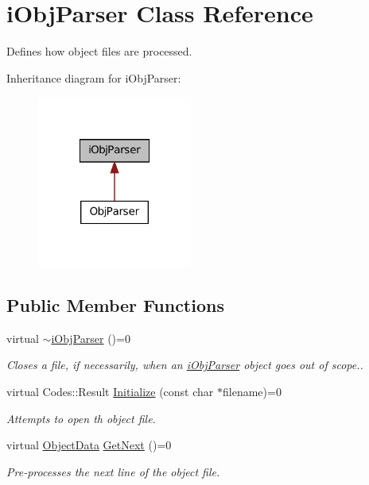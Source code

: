 \hypertarget{classiObjParser}{
\section{iObjParser Class Reference}
\label{classiObjParser}
}


Defines how object files are processed.  




Inheritance diagram for iObjParser:
\nopagebreak
\begin{figure}[H]
\begin{center}
\leavevmode
\includegraphics[width=144pt]{classiObjParser__inherit__graph}
\end{center}
\end{figure}
\subsection*{Public Member Functions}
\begin{DoxyCompactItemize}
\item 
\hypertarget{classiObjParser_ae88aacaa19a6aa6d4a7c82c02eabc3dc}{
virtual \hyperlink{classiObjParser_ae88aacaa19a6aa6d4a7c82c02eabc3dc}{$\sim$iObjParser} ()=0}
\label{classiObjParser_ae88aacaa19a6aa6d4a7c82c02eabc3dc}

\begin{DoxyCompactList}\small\item\em Closes a file, if necessarily, when an \hyperlink{classiObjParser}{iObjParser} object goes out of scope.. \item\end{DoxyCompactList}\item 
virtual Codes::Result \hyperlink{classiObjParser_a570e7a7dfb64b66e7a78f75ec4da193a}{Initialize} (const char $\ast$filename)=0
\begin{DoxyCompactList}\small\item\em Attempts to open th object file. \item\end{DoxyCompactList}\item 
virtual \hyperlink{structObjectData}{ObjectData} \hyperlink{classiObjParser_aeb9af4a40a06e755d8b0e493526d82dd}{GetNext} ()=0
\begin{DoxyCompactList}\small\item\em Pre-\/processes the next line of the object file. \item\end{DoxyCompactList}\end{DoxyCompactItemize}



